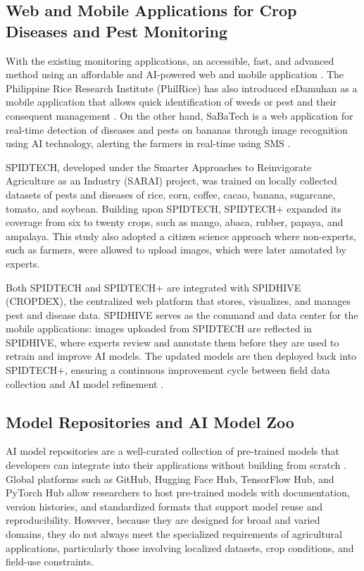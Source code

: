 \documentclass[journal]{./IEEE/IEEEtran}
\begin{document}
\subsection{Web and Mobile Applications for Crop Diseases and Pest Monitoring}
With the existing monitoring applications, an accessible, fast, and advanced method using an affordable and AI-powered web and mobile application \cite{Guiam_Gutierrez_Gapasin_Matalog_Ebuenga_2021}. The Philippine Rice Research Institute (PhilRice) has also introduced eDamuhan as a mobile application that allows quick identification of weeds or pest and their consequent management \cite{tallada-2020}. On the other hand, SaBaTech is a web application for real-time detection of diseases and pests on bananas through image recognition using AI technology, alerting the farmers in real-time using SMS \cite{magnaye-2025}.

SPIDTECH, developed under the Smarter Approaches to Reinvigorate Agriculture as an Industry (SARAI) project, was trained on locally collected datasets of pests and diseases of rice, corn, coffee, cacao, banana, sugarcane, tomato, and soybean. Building upon SPIDTECH, SPIDTECH+ \cite{belleza-2025} expanded its coverage from six to twenty crops, such as mango, abaca, rubber, papaya, and ampalaya. This study also adopted a citizen science approach where non-experts, such as farmers, were allowed to upload images, which were later annotated by experts. 

Both SPIDTECH and SPIDTECH+ are integrated with SPIDHIVE (CROPDEX), the centralized web platform that stores, visualizes, and manages pest and disease data. SPIDHIVE serves as the command and data center for the mobile applications: images uploaded from SPIDTECH are reflected in SPIDHIVE, where experts review and annotate them before they are used to retrain and improve AI models. The updated models are then deployed back into SPIDTECH+, ensuring a continuous improvement cycle between field data collection and AI model refinement \cite{masicat-2025}.

\subsection{Model Repositories and AI Model Zoo} 
AI model repositories are a well-curated collection of pre-trained models that developers can integrate into their applications without building from scratch \cite{India_2025}. Global platforms such as GitHub, Hugging Face Hub, TensorFlow Hub, and PyTorch Hub allow researchers to host pre-trained models with documentation, version histories, and standardized formats that support model reuse and reproducibility. However, because they are designed for broad and varied domains, they do not always meet the specialized requirements of agricultural applications, particularly those involving localized datasets, crop conditions, and field-use constraints.
\end{document}
